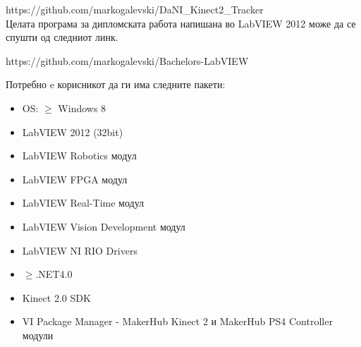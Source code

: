 \documentclass[12pt]{article}
\begin{document}
    https://github.com/markogalevski/DaNI\_Kinect2\_Tracker
    \\
    Целата програма за дипломската работа напишана во LabVIEW 2012 може да се спушти од следниот линк.

    https://github.com/markogalevski/Bachelors-LabVIEW

    Потребно e корисникот да ги има следните пакети:
    \begin{itemize}
      \item OS: $\geq$ Windows 8
      \item LabVIEW 2012 (32bit)
      \item LabVIEW Robotics модул
      \item LabVIEW FPGA модул
      \item LabVIEW Real-Time модул
      \item LabVIEW Vision Development модул
      \item LabVIEW NI RIO Drivers
      \item $\geq$.NET4.0
      \item Kinect 2.0 SDK
      \item VI Package Manager - MakerHub Kinect 2 и MakerHub PS4 Controller модули
      \end{itemize}

\medskip
\nocite{*}
\newpage
\printbibliography[heading=bibintoc,title={Користена литература}]
\end{document}
